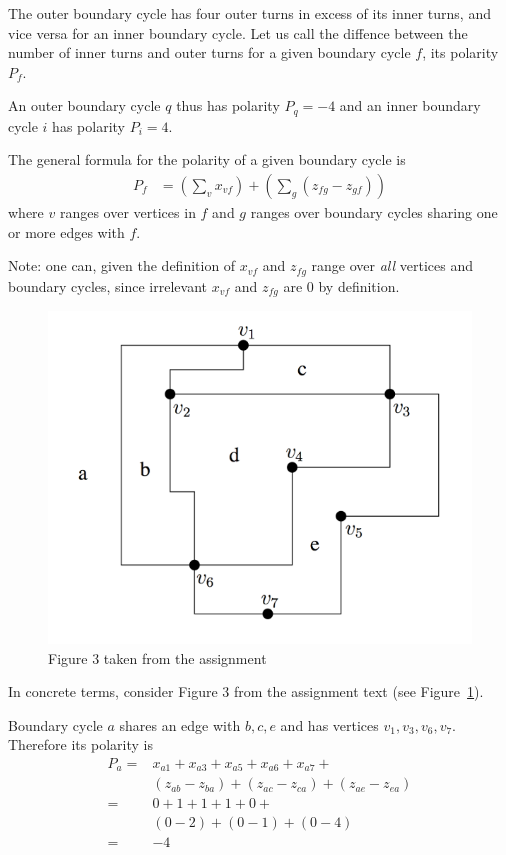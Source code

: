 The outer boundary cycle has four outer turns in excess of its inner turns, and vice
versa for an inner boundary cycle. Let us call the diffence between the number of inner turns 
and outer turns for a given boundary cycle $f$, its polarity $P_f$.

An outer boundary cycle $q$ thus has polarity $P_q = -4$ and an inner boundary cycle $i$ has polarity $P_i = 4$.

The general formula for the polarity of a given boundary cycle is
\begin{align*}
  P_f &= \left(\sum_v x_{vf}\right) + \left(\sum_g ( z_{fg} - z_{gf} ) \right)
\end{align*}
where $v$ ranges over vertices in $f$ and $g$ ranges over boundary cycles sharing one or more edges
with $f$.

Note: one can, given the definition of $x_{vf}$ and $z_{fg}$ range over \emph{all} vertices and 
boundary cycles, since irrelevant $x_{vf}$ and $z_{fg}$ are $0$ by definition.

\begin{figure}
  \label{fig:rect-layout}
  \begin{center}
    \includegraphics[scale=0.5]{img/fig3.png}
  \end{center}
  \caption{Figure 3 taken from the assignment}
\end{figure}

In concrete terms, consider Figure 3 from the assignment text (see Figure~\ref{fig:rect-layout}).

Boundary cycle $a$ shares an edge with $b, c, e$ and has vertices $v_1, v_3, v_6, v_7$. Therefore
its polarity is
\begin{align*}
  P_a = &x_{a1} + x_{a3} + x_{a5} + x_{a6} + x_{a7} + \\
        &(z_{ab} - z_{ba}) + (z_{ac} - z_{ca}) + (z_{ae} - z_{ea}) \\
      = & 0 + 1 + 1 + 1 + 0 + \\
        & (0 - 2) + (0 - 1) + (0 - 4) \\
      = & -4
\end{align*}

